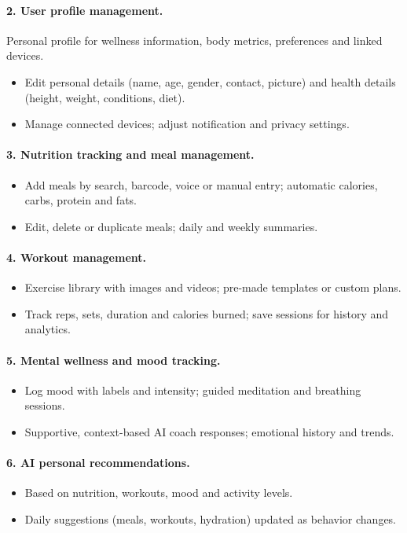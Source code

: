 \documentclass[11pt,a4paper]{report}
\begin{document}
\paragraph{2. User profile management.} Personal profile for wellness information, body metrics, preferences and linked devices.
\begin{itemize}
 \item Edit personal details (name, age, gender, contact, picture) and health details (height, weight, conditions, diet).
 \item Manage connected devices; adjust notification and privacy settings.
\end{itemize}
\paragraph{3. Nutrition tracking and meal management.}
\begin{itemize}
 \item Add meals by search, barcode, voice or manual entry; automatic calories, carbs, protein and fats.
 \item Edit, delete or duplicate meals; daily and weekly summaries.
\end{itemize}
\paragraph{4. Workout management.}
\begin{itemize}
 \item Exercise library with images and videos; pre-made templates or custom plans.
 \item Track reps, sets, duration and calories burned; save sessions for history and analytics.
\end{itemize}
\paragraph{5. Mental wellness and mood tracking.}
\begin{itemize}
 \item Log mood with labels and intensity; guided meditation and breathing sessions.
 \item Supportive, context-based AI coach responses; emotional history and trends.
\end{itemize}
\paragraph{6. AI personal recommendations.}
\begin{itemize}
 \item Based on nutrition, workouts, mood and activity levels.
 \item Daily suggestions (meals, workouts, hydration) updated as behavior changes.
\end{itemize}
\end{document}
